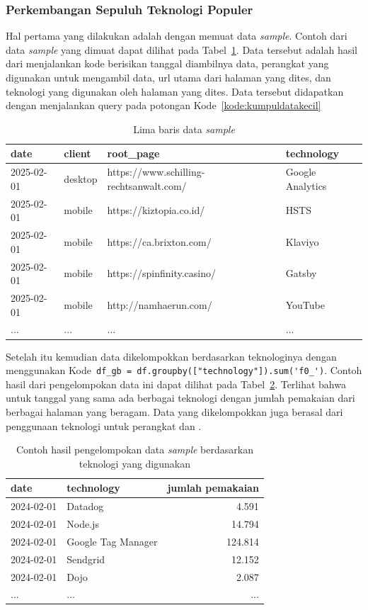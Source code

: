\subsubsection{Perkembangan Sepuluh Teknologi Populer}
\label{subsub: 10semua}
Hal pertama yang dilakukan adalah dengan memuat data \textit{sample}. Contoh dari data \textit{sample} yang dimuat dapat dilihat pada Tabel~\ref{tab:sample}. Data tersebut adalah hasil dari menjalankan kode berisikan tanggal diambilnya data, perangkat yang digunakan untuk mengambil data, url utama dari halaman \web yang dites, dan teknologi yang digunakan oleh halaman \web yang dites. Data tersebut didapatkan dengan menjalankan query pada potongan Kode~\ref{kode:kumpuldatakecil} 
\begin{table}[H]
    \centering
    \caption{Lima baris data \textit{sample}}
    \label{tab:sample}
    \begin{tabular}{|l|l|l|l|}
        \hline
        date & client & root\_page & technology \\ \hline
        2025-02-01 & desktop & https://www.schilling-rechtsanwalt.com/ & Google Analytics \\ \hline
        2025-02-01 & mobile & https://kiztopia.co.id/ & HSTS \\ \hline
        2025-02-01 & mobile & https://ca.brixton.com/ & Klaviyo \\ \hline
        2025-02-01 & mobile & https://spinfinity.casino/ & Gatsby \\ \hline
        2025-02-01 & mobile & http://namhaerun.com/ & YouTube \\ \hline
        ...&...&...&... \\ \hline
    \end{tabular}
\end{table}

Setelah itu kemudian data dikelompokkan berdasarkan teknologinya dengan menggunakan Kode~\verb|df_gb = df.groupby(["technology"]).sum('f0_')|. Contoh hasil dari pengelompokan data ini dapat dilihat pada Tabel~\ref{tab:gbsample}. Terlihat bahwa untuk tanggal yang sama ada berbagai teknologi dengan jumlah pemakaian dari berbagai halaman \web yang beragam. Data yang dikelompokkan juga berasal dari penggunaan teknologi untuk perangkat \mobile dan \desktop.
\begin{table}[H]
    \centering
    \caption{Contoh hasil pengelompokan data \textit{sample} berdasarkan teknologi yang digunakan}
    \label{tab:gbsample}
    \begin{tabular}{|l|l|r|}
        \hline
        date & technology & jumlah pemakaian \\ \hline
        2024-02-01 & Datadog & 4.591 \\ \hline
        2024-02-01 & Node.js & 14.794 \\ \hline
        2024-02-01 & Google Tag Manager & 124.814 \\ \hline
        2024-02-01 & Sendgrid & 12.152 \\ \hline
        2024-02-01 & Dojo & 2.087 \\ \hline
        ...&...&... \\ \hline
    \end{tabular}
\end{table}

